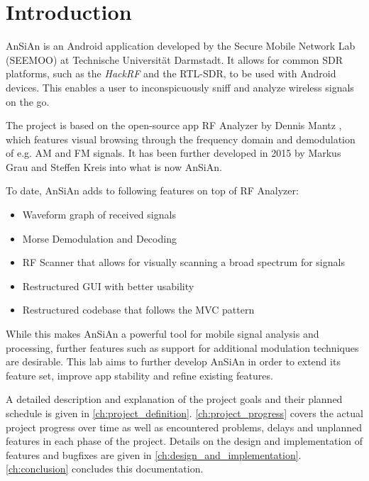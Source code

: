 \chapter{Introduction}\label{ch:introduction}
\glsresetall %
\setcounter{table}{0} %

\ac{AnSiAn} is an Android application developed by the Secure Mobile Network Lab (SEEMOO) at 
Technische Universität Darmstadt. It allows for common \ac{SDR} platforms, such as the \emph{HackRF} and the RTL-SDR, to be used with Android devices. This enables a user to inconspicuously sniff and analyze wireless signals on the go.

The project is based on the open-source app RF Analyzer by Dennis Mantz \cite{RFAnalyzer_GitHub}, which features visual browsing through the frequency domain and demodulation of e.g. \ac{AM} and \ac{FM} signals. It has been further developed in 2015 by Markus Grau and Steffen Kreis into what is now \ac{AnSiAn}.

To date, \ac{AnSiAn} adds to following features on top of RF Analyzer:

\begin{itemize}
	\item Waveform graph of received signals
	\item Morse Demodulation and Decoding
	\item RF Scanner that allows for visually scanning a broad spectrum for signals
	\item Restructured \ac{GUI} with better usability
	\item Restructured codebase that follows the \ac{MVC} pattern
\end{itemize}

While this makes \ac{AnSiAn} a powerful tool for mobile signal analysis and processing, further features such as support for additional modulation techniques are desirable. This lab aims to further develop \ac{AnSiAn} in order to extend its feature set, improve app stability and refine existing features.

A detailed description  and explanation of the project goals and their planned schedule is given in \autoref{ch:project_definition}. \autoref{ch:project_progress} covers the actual project progress over time as well as encountered problems, delays and unplanned features in each phase of the project. Details on the design and implementation of features and bugfixes are given in \autoref{ch:design_and_implementation}.
\autoref{ch:conclusion} concludes this documentation.
